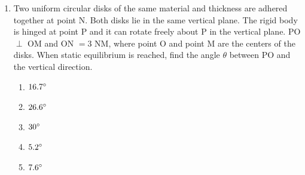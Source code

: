 \documentclass[12pt,letterpaper]{article}
\begin{document}
\begin{enumerate}[resume]


\item
Two uniform circular disks of the same material and thickness are adhered together at point N. Both disks lie in the same vertical plane. The rigid body is hinged at point P and it can rotate freely about P in the vertical plane.  PO $\perp$ OM and ON $= 3$ NM, where point O and point M are the centers of the disks. When static equilibrium is reached, find the angle $\theta$ between PO and the vertical direction.
\begin{enumerate}
\item $16.7\degree$
\item $26.6\degree$
\item $30\degree$
\item $5.2\degree$
\item $7.6\degree$
\end{enumerate}


\end{enumerate}
\end{document}
